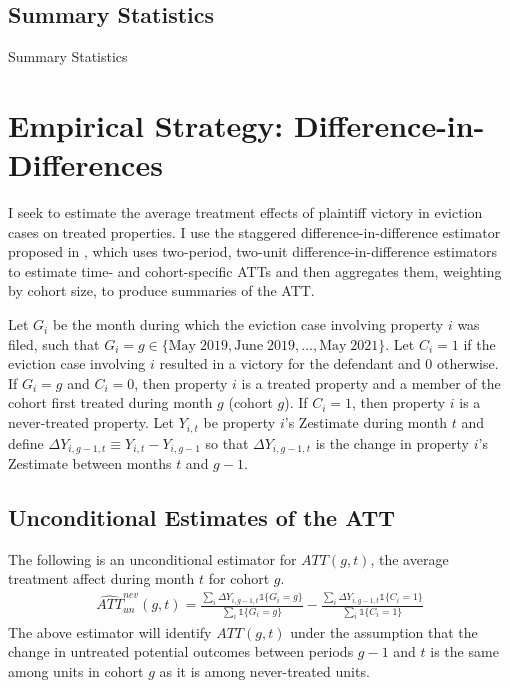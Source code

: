 \documentclass[12pt]{article}
\begin{document}
    \subsection{Summary Statistics}
         \begin{table}[H]
            \centering
            \small
            
            \caption{Summary Statistics}
            \label{tab:table_1}
        \end{table}
        \newpage

\section{Empirical Strategy: Difference-in-Differences}
    I seek to estimate the average treatment effects of plaintiff victory in eviction cases on treated properties. I use the staggered difference-in-difference estimator proposed in \cite{callaway_difference--differences_2021}, which uses two-period, two-unit difference-in-difference estimators to estimate time- and cohort-specific ATTs and then aggregates them, weighting by cohort size, to produce summaries of the ATT. 
    
    
    Let $G_i$ be the month during which the eviction case involving property $i$ was filed, such that $G_i = g \in \{\text{May} \; 2019, \text{June} \; 2019, ..., \text{May} \; 2021\}$. Let $C_i = 1$ if the eviction case involving $i$ resulted in a victory for the defendant and $0$ otherwise. If $G_i = g$ and $C_i = 0$, then property $i$ is a treated property and a member of the cohort first treated during month $g$ (cohort $g$). If $C_i=1$, then property $i$ is a never-treated property. Let $Y_{i,t}$ be property $i$'s Zestimate during month $t$ and define $\Delta Y_{i, g-1, t} \equiv Y_{i,t} - Y_{i,g-1}$ so that $\Delta Y_{i, g-1, t}$ is the change in property $i$'s Zestimate between months $t$ and $g-1$.

    \subsection{Unconditional Estimates of the ATT}
    The following is an unconditional estimator for $ATT(g,t)$, the average treatment affect during month $t$ for cohort $g$.
    \begin{align}
        \hat{ATT}^{nev}_{un}(g, t) = \frac{\sum_i\Delta Y_{i, g-1, t}\mathds{1}\{G_i=g\}}{\sum_i\mathds{1}\{G_i=g\}} - \frac{\sum_i\Delta Y_{i, g-1, t}\mathds{1}\{C_i=1\}}{\sum_i\mathds{1}\{C_i=1\}}
    \end{align}
    The above estimator will identify $ATT(g,t)$ under the assumption that the change in untreated potential outcomes between periods $g-1$ and $t$ is the same among units in cohort $g$ as it is among never-treated units.
\end{document}
